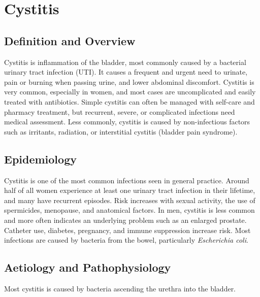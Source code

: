 \chapter{Cystitis}

\section*{Definition and Overview}
Cystitis is inflammation of the bladder, most commonly caused by a bacterial urinary tract infection (UTI). It causes a frequent and urgent need to urinate, pain or burning when passing urine, and lower abdominal discomfort. Cystitis is very common, especially in women, and most cases are uncomplicated and easily treated with antibiotics. Simple cystitis can often be managed with self-care and pharmacy treatment, but recurrent, severe, or complicated infections need medical assessment. Less commonly, cystitis is caused by non-infectious factors such as irritants, radiation, or interstitial cystitis (bladder pain syndrome).

\section*{Epidemiology}
Cystitis is one of the most common infections seen in general practice. Around half of all women experience at least one urinary tract infection in their lifetime, and many have recurrent episodes. Risk increases with sexual activity, the use of spermicides, menopause, and anatomical factors. In men, cystitis is less common and more often indicates an underlying problem such as an enlarged prostate. Catheter use, diabetes, pregnancy, and immune suppression increase risk. Most infections are caused by bacteria from the bowel, particularly \textit{Escherichia coli}.

\section*{Aetiology and Pathophysiology}
Most cystitis is caused by bacteria ascending the urethra into the bladder.

